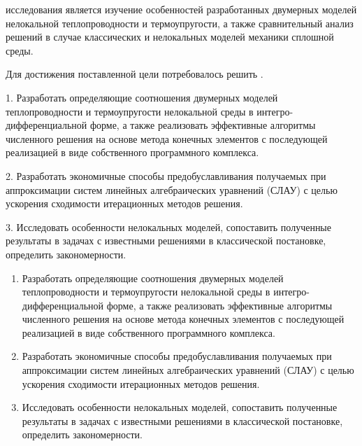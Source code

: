 

{\aim} исследования является изучение особенностей разработанных двумерных моделей нелокальной теплопроводности и термоупругости, а также сравнительный анализ решений в случае классических и нелокальных моделей механики сплошной среды.

Для достижения поставленной цели потребовалось решить {\tasks}.
\ifsynopsis

1. Разработать определяющие соотношения двумерных моделей теплопроводности и термоупругости нелокальной среды в интегро-дифференциальной форме, а также реализовать эффективные алгоритмы численного решения на основе метода конечных элементов с последующей реализацией в виде собственного программного комплекса.

2. Разработать экономичные способы предобуславливания получаемых при аппроксимации систем линейных алгебраических уравнений (СЛАУ) с целью ускорения сходимости итерационных методов решения.

3. Исследовать особенности нелокальных моделей, сопоставить полученные результаты в задачах с известными решениями в классической постановке, определить закономерности.
\else
\begin{enumerate}[beginpenalty=10000] %
  \item Разработать определяющие соотношения двумерных моделей теплопроводности и термоупругости нелокальной среды в интегро-дифференциальной форме, а также реализовать эффективные алгоритмы численного решения на основе метода конечных элементов с последующей реализацией в виде собственного программного комплекса.
  \item Разработать экономичные способы предобуславливания получаемых при аппроксимации систем линейных алгебраических уравнений (СЛАУ) с целью ускорения сходимости итерационных методов решения.
  \item Исследовать особенности нелокальных моделей, сопоставить полученные результаты в задачах с известными решениями в классической постановке, определить закономерности.
\end{enumerate}
\fi


